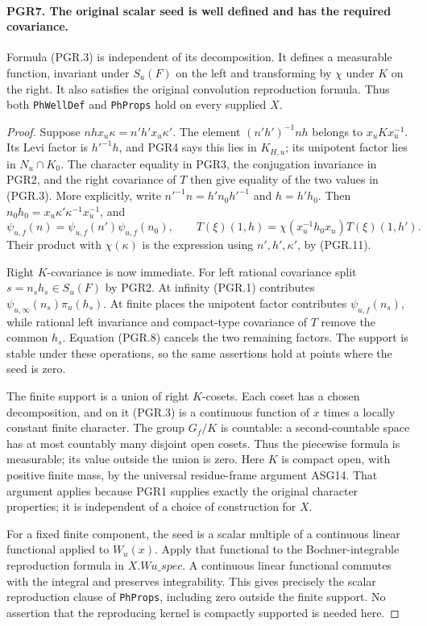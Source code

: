 \paragraph{PGR7. The original scalar seed is well defined and has the required covariance.}
\label{claim:PGR7}
Formula (PGR.3) is independent of its decomposition.  It defines a
measurable function, invariant under \(S_u(F)\) on the left and
transforming by \(\chi\) under \(K\) on the right.  It also
satisfies the original convolution reproduction formula.  Thus both
\texttt{PhWellDef} and \texttt{PhProps} hold on every supplied \(X\).
\begin{proof}
Suppose \(nhx_u\kappa=n'h'x_u\kappa'\).  The element
\((n'h')^{-1}nh\) belongs to \(x_uKx_u^{-1}\).
Its Levi factor is \(h'^{-1}h\), and PGR4 says this lies in
\(K_{H,u}\); its unipotent factor lies in \(N_u\cap K_0\).
The character equality in PGR3, the conjugation invariance in PGR2,
and the right covariance of \(T\) then give equality of the two
values in (PGR.3).  More explicitly, write
\(n'^{-1}n=h' n_0 h'^{-1}\) and \(h=h'h_0\).  Then
\(n_0h_0=x_u\kappa'\kappa^{-1}x_u^{-1}\), and
\[
 \psi_{u,f}(n)=\psi_{u,f}(n')\psi_{u,f}(n_0),\qquad
 T(\xi)(1,h)=\chi(x_u^{-1}h_0x_u)T(\xi)(1,h').
\]
Their product with \(\chi(\kappa)\) is the expression using
\(n',h',\kappa'\), by (PGR.11).

Right \(K\)-covariance is now immediate.  For left rational
covariance split \(s=n_sh_s\in S_u(F)\) by PGR2.
At infinity (PGR.1) contributes
\(\psi_{u,\infty}(n_s)\pi_u(h_s)\).  At finite places the
unipotent factor contributes \(\psi_{u,f}(n_s)\), while
rational left invariance and compact-type covariance of \(T\)
remove the common \(h_s\).  Equation (PGR.8) cancels the two
remaining factors.  The support is stable under these operations,
so the same assertions hold at points where the seed is zero.

The finite support is a union of right \(K\)-cosets.  Each coset
has a chosen decomposition, and on it (PGR.3) is a continuous
function of \(x\) times a locally constant finite character.
The group \(G_f/K\) is countable: a second-countable space has
at most countably many disjoint open cosets.  Thus the piecewise
formula is measurable; its value outside the union is zero.
Here \(K\) is compact open, with positive finite mass, by the
universal residue-frame argument ASG14.  That argument applies
because PGR1 supplies exactly the original character properties;
it is independent of a choice of construction for \(X\).

For a fixed finite component, the seed is a scalar multiple of a
continuous linear functional applied to \(W_u(x)\).
Apply that functional to the Bochner-integrable reproduction formula
in \(X.Wu\_spec\).  A continuous linear functional commutes with
the integral and preserves integrability.  This gives precisely the
scalar reproduction clause of \texttt{PhProps}, including zero
outside the finite support.  No assertion that the reproducing
kernel is compactly supported is needed here.
\end{proof}

